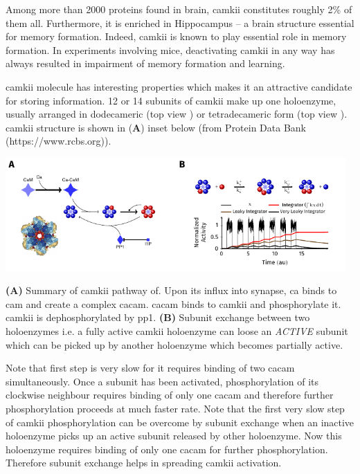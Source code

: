 \documentclass[]{resonance}
\begin{document}
 {
    Among more than 2000 proteins found in brain, \gls{camkii} constitutes roughly
    2\% of them all. Furthermore, it is enriched in Hippocampus -- a brain structure
    essential for memory formation. Indeed, \gls{camkii} is known to play essential
    role in memory formation. In experiments involving mice, deactivating
    \gls{camkii} in any way has always resulted in impairment of memory formation
    and learning. 

    \gls{camkii} molecule has interesting properties which makes it an
    attractive candidate for storing information. 12 or 14 subunits of \gls{camkii} make
    up one holoenzyme, usually arranged in dodecameric (top view ) or tetradecameric form (top view ). \gls{camkii}
    structure is shown in (\textbf{A}) inset below (from Protein Data Bank
    (https://www.rcbs.org)).

    \includegraphics[width=13cm]{./camkii_properties.pdf}

    \textbf{(A)} Summary of \gls{camkii} pathway of. Upon its influx into
    synapse, \gls{ca} binds to \gls{cam} and create a complex \gls{cacam}.
    \gls{cacam} binds to \gls{camkii} and phosphorylate it.  \gls{camkii} is
    dephosphorylated by \gls{pp1}. \textbf{(B)} Subunit exchange
    between two holoenzymes i.e. a fully active \gls{camkii} holoenzyme can
    loose an \textit{ACTIVE} subunit which can be picked up by another
    holoenzyme which becomes partially active. 
    
    Note that first step is very slow for it requires binding of two \gls{cacam}
    simultaneously. Once a subunit has been
    activated, phosphorylation of its clockwise neighbour requires binding of only one
    \gls{cacam} and therefore further phosphorylation proceeds at much faster rate.
    Note that the first very slow step of \gls{camkii} phosphorylation can be
    overcome by subunit exchange when an inactive holoenzyme picks up an active
    subunit released by other holoenzyme. Now this holoenzyme requires binding 
    of only one \gls{cacam} for further phosphorylation. Therefore subunit exchange
    helps in spreading \gls{camkii} activation. 

}
\end{document}
